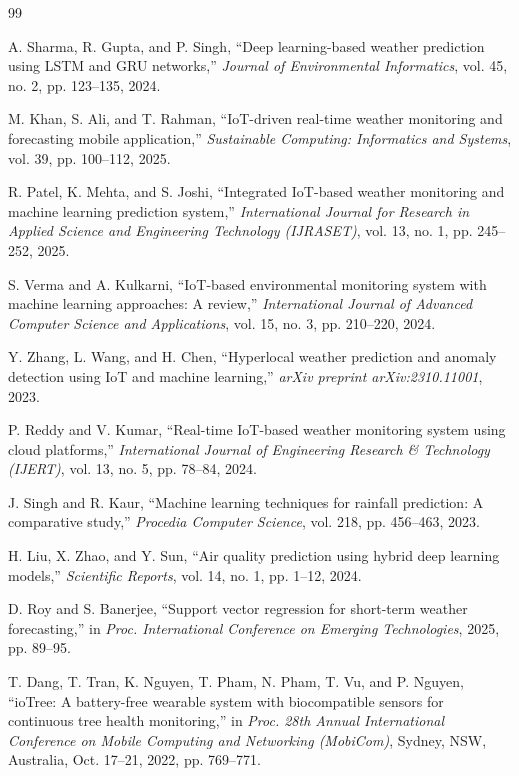 \documentclass[conference]{IEEEtran}
\begin{document}
\begin{thebibliography}{99}

A. Sharma, R. Gupta, and P. Singh,
``Deep learning-based weather prediction using LSTM and GRU networks,''
\textit{Journal of Environmental Informatics},
vol. 45, no. 2, pp. 123--135, 2024.

M. Khan, S. Ali, and T. Rahman,
``IoT-driven real-time weather monitoring and forecasting mobile application,''
\textit{Sustainable Computing: Informatics and Systems},
vol. 39, pp. 100--112, 2025.

R. Patel, K. Mehta, and S. Joshi,
``Integrated IoT-based weather monitoring and machine learning prediction system,''
\textit{International Journal for Research in Applied Science and Engineering Technology (IJRASET)},
vol. 13, no. 1, pp. 245--252, 2025.

S. Verma and A. Kulkarni,
``IoT-based environmental monitoring system with machine learning approaches: A review,''
\textit{International Journal of Advanced Computer Science and Applications},
vol. 15, no. 3, pp. 210--220, 2024.

Y. Zhang, L. Wang, and H. Chen,
``Hyperlocal weather prediction and anomaly detection using IoT and machine learning,''
\textit{arXiv preprint arXiv:2310.11001},
2023.

P. Reddy and V. Kumar,
``Real-time IoT-based weather monitoring system using cloud platforms,''
\textit{International Journal of Engineering Research \& Technology (IJERT)},
vol. 13, no. 5, pp. 78--84, 2024.

J. Singh and R. Kaur,
``Machine learning techniques for rainfall prediction: A comparative study,''
\textit{Procedia Computer Science},
vol. 218, pp. 456--463, 2023.

H. Liu, X. Zhao, and Y. Sun,
``Air quality prediction using hybrid deep learning models,''
\textit{Scientific Reports},
vol. 14, no. 1, pp. 1--12, 2024.

D. Roy and S. Banerjee,
``Support vector regression for short-term weather forecasting,''
in \textit{Proc. International Conference on Emerging Technologies},
2025, pp. 89--95.

T. Dang, T. Tran, K. Nguyen, T. Pham, N. Pham, T. Vu, and P. Nguyen,
``ioTree: A battery-free wearable system with biocompatible sensors for continuous tree health monitoring,''
in \textit{Proc. 28th Annual International Conference on Mobile Computing and Networking (MobiCom)},
Sydney, NSW, Australia, Oct. 17--21, 2022, pp. 769--771.

\end{thebibliography}
\end{document}
